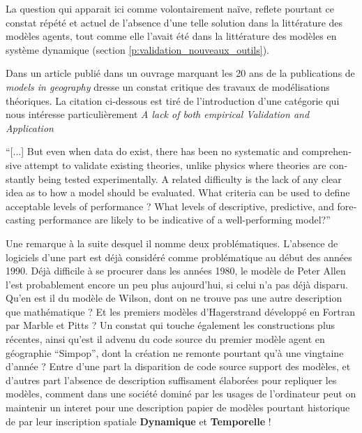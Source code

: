La question qui apparait ici comme volontairement naïve, reflete pourtant ce constat répété et actuel de l'absence d'une telle solution dans la littérature des modèles agents, tout comme elle l'avait été dans la littérature des modèles en système dynamique (section \ref{p:validation_nouveaux_outils}).

Dans un article publié dans un ouvrage marquant les 20 ans de la publications de \textit{models in geography} \textcite{Openshaw1989} dresse un constat critique des travaux de modélisations théoriques. La citation ci-dessous est tiré de l'introduction d'une catégorie qui nous intéresse particulièrement \textit{A lack of both empirical Validation and Application} 

\foreignquote{english}{[...] But even when data do exist, there has been no systematic and comprehensive attempt to validate existing theories, unlike physics where theories are constantly being tested experimentally. A related difficulty is the lack of any clear idea as to how a model should be evaluated. What criteria can be used to define acceptable levels of performance ? What levels of descriptive, predictive, and forecasting performance are likely to be indicative of a well-performing model?} \autocite[78]{Openshaw1989}

Une remarque à la suite desquel il nomme deux problématiques. L'absence de logiciels d'une part  est déjà considéré comme problématique au début des années 1990. Déjà difficile à se procurer dans les années 1980, le modèle de Peter Allen l'est probablement encore un peu plus aujourd'hui, si celui n'a pas déjà disparu. Qu'en est il du modèle de Wilson, dont on ne trouve pas une autre description que mathématique ? Et les premiers modèles d'Hagerstrand développé en Fortran par Marble et Pitts ? Un constat qui touche également les constructions plus récentes, ainsi qu'est il advenu du code source du premier modèle agent en géographie \enquote{Simpop}, dont la création ne remonte pourtant qu'à une vingtaine d'année ? Entre d'une part la disparition de code source support des modèles, et d'autres part l'absence de description suffisament élaborées pour repliquer les modèles, comment dans une société dominé par les usages de l'ordinateur peut on maintenir un interet pour une description papier de modèles pourtant historique de par leur inscription spatiale \textbf{Dynamique} et \textbf{Temporelle} !


